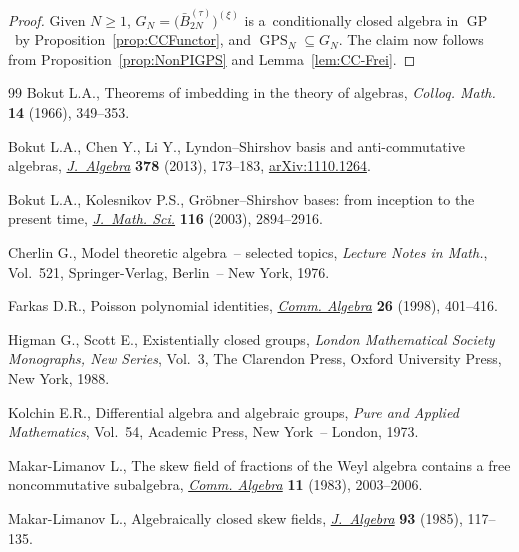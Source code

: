 \documentclass[11pt]{article}
\begin{document}
\begin{proof}
Given $N\ge 1$, $G_N = \big(\bar B_{2N}^{(\tau)}\big)^{(\xi)}$ is a~conditionally closed algebra in $\operatorname{GP}$~by
Proposition~\ref{prop:CCFunctor}, and $\operatorname{GPS}_N\subseteq G_N$.
The claim now follows from Proposition~\ref{prop:NonPIGPS} and Lemma~\ref{lem:CC-Frei}.
\end{proof}
\begin{thebibliography}{99}
Bokut L.A., Theorems of imbedding in the theory of algebras, \textit{Colloq.
  Math.} \textbf{14} (1966), 349--353.

Bokut L.A., Chen Y., Li Y., Lyndon--{S}hirshov basis and anti-commutative
  algebras, \href{http://dx.doi.org/10.1016/j.jalgebra.2012.12.017}{\textit{J.~Algebra}} \textbf{378} (2013), 173--183,
  \href{http://arxiv.org/abs/1110.1264}{arXiv:1110.1264}.

Bokut L.A., Kolesnikov P.S., Gr\"obner--{S}hirshov bases: from inception to the
  present time, \href{http://dx.doi.org/10.1023/A:1023490323855}{\textit{J.~Math. Sci.}} \textbf{116} (2003), 2894--2916.

Cherlin G., Model theoretic algebra~-- selected topics, \textit{Lecture Notes
  in Math.}, Vol.~521, Springer-Verlag, Berlin~-- New York, 1976.

Farkas D.R., Poisson polynomial identities, \href{http://dx.doi.org/10.1080/00927879808826136}{\textit{Comm. Algebra}} \textbf{26}
  (1998), 401--416.

Higman G., Scott E., Existentially closed groups, \textit{London Mathematical
  Society Monographs, New Series}, Vol.~3, The Clarendon Press, Oxford
  University Press, New York, 1988.

Kolchin E.R., Dif\/ferential algebra and algebraic groups, \textit{Pure and
  Applied Mathematics}, Vol.~54, Academic Press, New York~-- London, 1973.

Makar-Limanov L., The skew f\/ield of fractions of the {W}eyl algebra contains a
  free noncommutative subalgebra, \href{http://dx.doi.org/10.1080/00927878308822945}{\textit{Comm. Algebra}} \textbf{11} (1983),
  2003--2006.

Makar-Limanov L., Algebraically closed skew f\/ields, \href{http://dx.doi.org/10.1016/0021-8693(85)90177-2}{\textit{J.~Algebra}}
  \textbf{93} (1985), 117--135.


\end{thebibliography}
\end{document}
